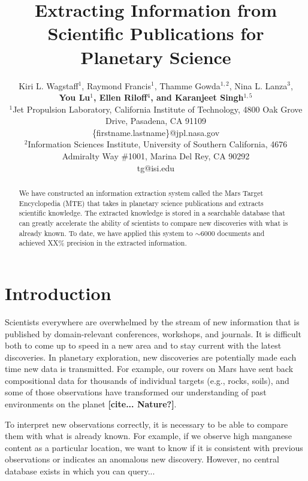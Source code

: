\documentclass[letterpaper]{article} %
\begin{document}
%
\title{Extracting Information from Scientific Publications for
Planetary Science}
\author{
Kiri L. Wagstaff$^1$,
Raymond Francis$^1$,
Thamme Gowda$^{1,2}$,
Nina L. Lanza$^3$,\\
{\Large \bf You Lu$^1$,
Ellen Riloff$^4$, and
Karanjeet Singh$^{1,5}$}\\
$^1$Jet Propulsion Laboratory, California Institute of Technology,
4800 Oak Grove Drive, Pasadena, CA 91109\\
\{firstname.lastname\}@jpl.nasa.gov\\
$^2$Information Sciences Institute, University of Southern
California,
4676 Admiralty Way \#1001, Marina Del Rey, CA 90292\\
tg@isi.edu
}
\maketitle
\begin{abstract}
We have constructed an information extraction system called the Mars
Target Encyclopedia (MTE) that takes in planetary science publications
and extracts scientific knowledge.  The extracted knowledge is stored
in a searchable database that can greatly accelerate the ability of
scientists to compare new discoveries with what is already known.  To
date, we have applied this system to $\sim$6000 documents and achieved
XX\% precision in the extracted information. 
\end{abstract}

\section{Introduction}

Scientists everywhere are overwhelmed by the stream of new information
that is published by domain-relevant conferences, workshops, and
journals.  It is difficult both to come up to speed in a new area and
to stay current with the latest discoveries.  In planetary
exploration, new discoveries are potentially made each time new data
is transmitted.  For example, our rovers on Mars have sent back
compositional data for thousands of individual targets (e.g., rocks,
soils), and some of those observations have transformed our
understanding of past environments on the planet {\bf
[cite... Nature?]}. 

To interpret new observations correctly, it is necessary to be able to
compare them with what is already known.  For example, if we observe
high manganese content as a particular location, we want to know if it
is consistent with previous observations or indicates an anomalous new
discovery.  However, no central database exists in which you can query...
\end{document}
